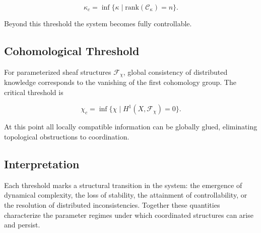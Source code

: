 \documentclass[12pt]{article}
\begin{document}
\[
\kappa_c = \inf \{\kappa \mid \mathrm{rank}(\mathcal{C}_\kappa)=n\}.
\]

Beyond this threshold the system becomes fully controllable.

\subsection{Cohomological Threshold}

For parameterized sheaf structures $\mathcal{F}_\chi$, global consistency of distributed knowledge corresponds to the vanishing of the first cohomology group. The critical threshold is

\[
\chi_c = \inf \{\chi \mid H^1(X,\mathcal{F}_\chi)=0\}.
\]

At this point all locally compatible information can be globally glued, eliminating topological obstructions to coordination.

\subsection{Interpretation}

Each threshold marks a structural transition in the system: the emergence of dynamical complexity, the loss of stability, the attainment of controllability, or the resolution of distributed inconsistencies. Together these quantities characterize the parameter regimes under which coordinated structures can arise and persist.
\end{document}
